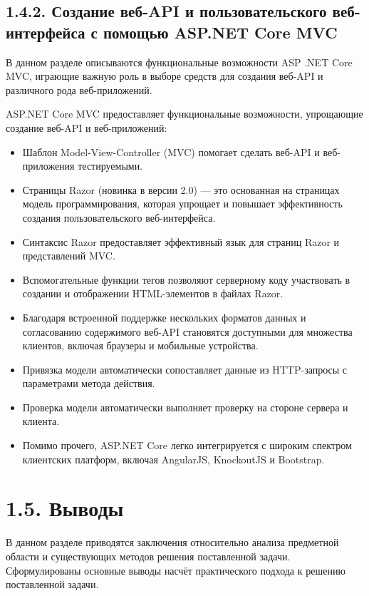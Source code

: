 \subsection{1.4.2. Создание веб-API и пользовательского веб-интерфейса с помощью ASP.NET Core MVC}


В данном разделе описываются функциональные возможности ASP .NET Core MVC, играющие важную роль в выборе средств для создания веб-API и различного рода веб-приложений.


ASP.NET Core MVC предоставляет функциональные возможности, упрощающие создание веб-API и веб-приложений:

\begin{itemize}

\item Шаблон Model-View-Controller (MVC) помогает сделать веб-API и веб-приложения тестируемыми.
\item Страницы Razor (новинка в версии 2.0) — это основанная на страницах модель программирования, которая упрощает и повышает эффективность создания пользовательского веб-интерфейса.
\item Синтаксис Razor предоставляет эффективный язык для страниц Razor и представлений MVC.
\item Вспомогательные функции тегов позволяют серверному коду участвовать в создании и отображении HTML-элементов в файлах Razor.
\item Благодаря встроенной поддержке нескольких форматов данных и согласованию содержимого веб-API становятся доступными для множества клиентов, включая браузеры и мобильные устройства.
\item Привязка модели автоматически сопоставляет данные из HTTP-запросы с параметрами метода действия.
\item Проверка модели автоматически выполняет проверку на стороне сервера и клиента.
\item Помимо прочего, ASP.NET Core легко интегрируется с широким спектром клиентских платформ, включая AngularJS, KnockoutJS и Bootstrap. \cite{freeman}
\end{itemize}

\section{1.5. Выводы}


В данном разделе приводятся заключения относительно анализа предметной области и существующих методов решения поставленной задачи. Сформулированы основные выводы насчёт практического подхода к решению поставленной задачи.



